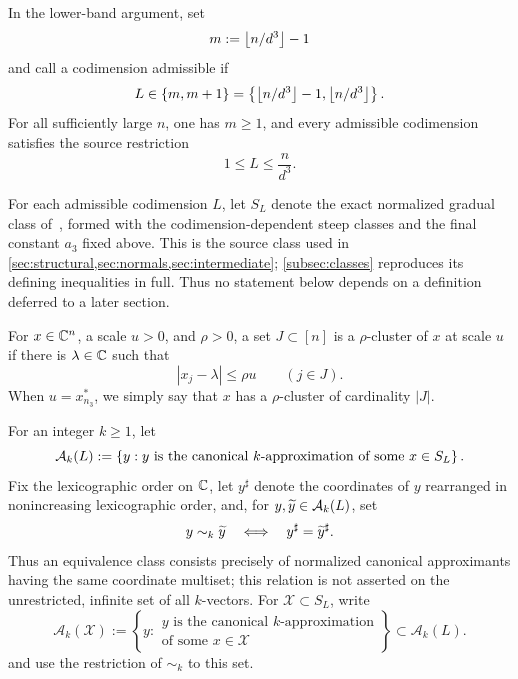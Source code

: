 In the lower-band argument, set
\[
  m:=\left\lfloor n/d^3\right\rfloor-1
\]
and call a codimension admissible if
\[
  L\in\{m,m+1\}
  =\left\{\left\lfloor n/d^3\right\rfloor-1,\left\lfloor n/d^3\right\rfloor\right\}.
\]
For all sufficiently large $n$, one has $m\ge1$, and every admissible codimension satisfies the source restriction
\[
  1\le L\le\frac n{d^3}.
\]

For each admissible codimension $L$, let $S_L$ denote the exact normalized gradual class of~\cite[Section~4]{LLTTY19}, formed with the codimension-dependent steep classes and the final constant $a_3$ fixed above. This is the source class used in \cref{sec:structural,sec:normals,sec:intermediate}; \cref{subsec:classes} reproduces its defining inequalities in full. Thus no statement below depends on a definition deferred to a later section.

For $x\in\mathbb C^n$, a scale $u>0$, and $\rho>0$, a set $J\subset[n]$ is a $\rho$-cluster of $x$ at scale $u$ if there is $\lambda\in\mathbb C$ such that
\[
  |x_j-\lambda|\le\rho u\qquad(j\in J).
\]
When $u=x^*_{n_3}$, we simply say that $x$ has a $\rho$-cluster of cardinality $|J|$.

For an integer $k\ge1$, let
\[
  \mathcal A_k(L):=\left\{y:y\text{ is the canonical $k$-approximation of some }x\in S_L\right\}.
\]
Fix the lexicographic order on $\mathbb C$, let $y^\sharp$ denote the coordinates of $y$ rearranged in nonincreasing lexicographic order, and, for $y,\widetilde y\in\mathcal A_k(L)$, set
\[
  y\sim_k\widetilde y\quad\Longleftrightarrow\quad y^\sharp=\widetilde y^\sharp.
\]
Thus an equivalence class consists precisely of normalized canonical approximants having the same coordinate multiset; this relation is not asserted on the unrestricted, infinite set of all $k$-vectors. For $\mathcal X\subset S_L$, write
\[
  \mathcal A_k(\mathcal X)
  :=\left\{y:\begin{array}{l}
    y\text{ is the canonical $k$-approximation}\\[-2pt]
    \text{of some }x\in\mathcal X
  \end{array}\right\}
  \subset\mathcal A_k(L).
\]
and use the restriction of $\sim_k$ to this set.

